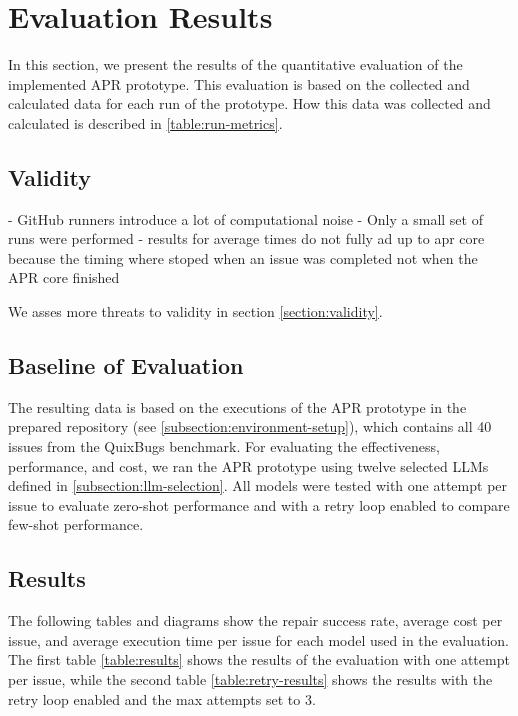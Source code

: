 \section{Evaluation Results} \label{section:evaluation-results}

In this section, we present the results of the quantitative evaluation of the implemented APR prototype. This evaluation is based on the collected and calculated data for each run of the prototype. How this data was collected and calculated is described in \ref{table:run-metrics}.

\subsection{Validity}

- GitHub runners introduce a lot of computational noise
- Only a small set of runs were performed
- results for average times do not fully ad up to apr core because the timing where stoped when an issue was completed not when the APR core finished

We asses more threats to validity in section \ref{section:validity}.

\subsection{Baseline of Evaluation}

The resulting data is based on the executions of the APR prototype in the prepared repository (see \ref{subsection:environment-setup}), which contains all 40 issues from the QuixBugs benchmark. For evaluating the effectiveness, performance, and cost, we ran the APR prototype using twelve selected \acp{LLM} defined in \ref{subsection:llm-selection}. All models were tested with one attempt per issue to evaluate zero-shot performance and with a retry loop enabled to compare few-shot performance.

\subsection{Results}

The following tables and diagrams show the repair success rate, average cost per issue, and average execution time per issue for each model used in the evaluation. The first table \ref{table:results} shows the results of the evaluation with one attempt per issue, while the second table \ref{table:retry-results} shows the results with the retry loop enabled and the max attempts set to 3.

